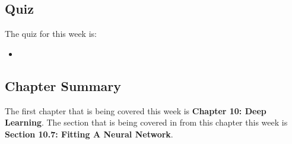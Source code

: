 \subsection{Quiz}

The quiz for this week is:

\begin{itemize}
    \item {}
\end{itemize}

\newpage

\subsection{Chapter Summary}

The first chapter that is being covered this week is \textbf{Chapter 10: Deep Learning}. The section that is being covered in from this chapter this week is \textbf{Section 10.7: Fitting A Neural Network}.

